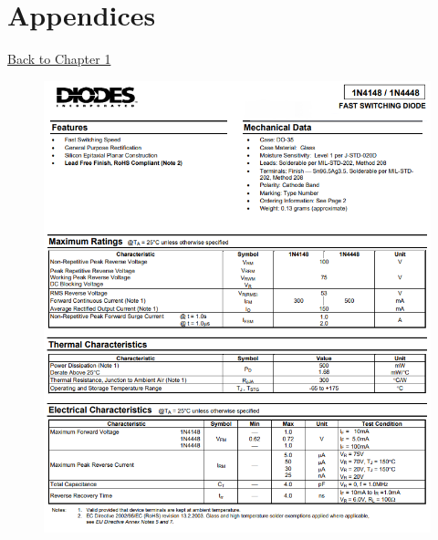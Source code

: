 \chapter*{Appendices}

\hyperlink{chapter.1}{Back to Chapter 1}

\FloatBarrier
\begin{figure}[h]
    \centering
    \includegraphics[width=0.9\linewidth]{Appendices/1N4148.png}
    \label{1N4148}
\end{figure}
\FloatBarrier

